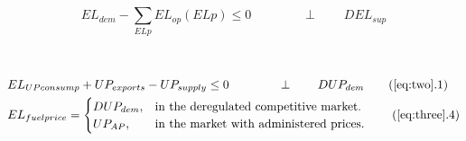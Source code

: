\documentclass{article}
\begin{document}
    \\
    \\
    $$EL_{dem} - \sum_{ELp}EL_{op}(ELp) \leq 0\qquad\qquad\perp\qquad DEL_{sup}$$
    \\
    \\
    \begin{align}
    &EL_{UPconsump}+UP_{exports}-UP_{supply} \leq 0\qquad\qquad\perp\qquad DUP_{dem}\tag{\ref{eq:two}.1}\\
    & EL_{fuelprice} = \begin{cases}
                            DUP_{dem}, & \text{in the deregulated competitive market}.\\
                            UP_{AP},    & \text{in the market with administered prices}.
                        \end{cases}\tag{\ref{eq:three}.4}
    \end{align}
\end{document}
